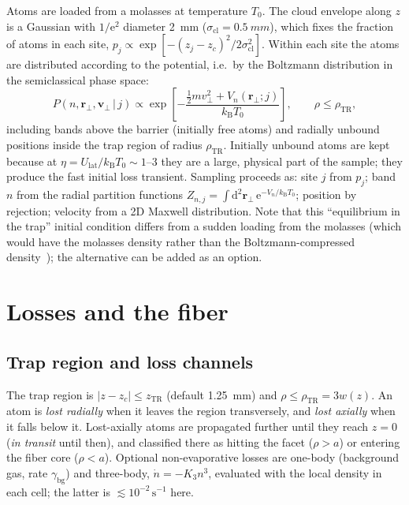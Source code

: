 \documentclass[11pt,a4paper]{article}
\newcommand{\ee}{\mathrm{e}}
\newcommand{\dd}{\mathrm{d}}
\newcommand{\kB}{k_\mathrm{B}}
\newcommand{\Ulat}{U_\mathrm{lat}}
\newcommand{\vperp}{\bm{v}_\perp}
\newcommand{\rperp}{\bm{r}_\perp}
\begin{document}
Atoms are loaded from a molasses at temperature $T_0$. The cloud envelope along $z$ is a Gaussian with $1/\ee^2$ diameter \SI{2}{mm} ($\sigma_\mathrm{cl}=\SI{0.5}{mm}$), which fixes the fraction of atoms in each site, $p_j\propto\exp[-(z_j-z_c)^2/2\sigma_\mathrm{cl}^2]$. Within each site the atoms are distributed according to the potential, i.e.\ by the Boltzmann distribution in the semiclassical phase space:
\begin{equation}
P(n,\rperp,\vperp\,|\,j)\propto\exp\!\left[-\frac{\frac12 m v_\perp^2+V_n(\rperp;j)}{\kB T_0}\right],\qquad \rho\le\rho_\mathrm{TR},
\end{equation}
including bands above the barrier (initially free atoms) and radially unbound positions inside the trap region of radius $\rho_\mathrm{TR}$. Initially unbound atoms are kept because at $\eta=\Ulat/\kB T_0\sim1$--3 they are a large, physical part of the sample; they produce the fast initial loss transient. Sampling proceeds as: site $j$ from $p_j$; band $n$ from the radial partition functions $Z_{n,j}=\int\dd^2\rperp\,\ee^{-V_n/\kB T_0}$; position by rejection; velocity from a 2D Maxwell distribution. Note that this ``equilibrium in the trap'' initial condition differs from a sudden loading from the molasses (which would have the molasses density rather than the Boltzmann-compressed density~\cite{Kuppens2000}); the alternative can be added as an option.

\section{Losses and the fiber}
\label{sec:losses}

\subsection{Trap region and loss channels}
The trap region is $|z-z_c|\le z_\mathrm{TR}$ (default \SI{1.25}{mm}) and $\rho\le\rho_\mathrm{TR}=3w(z)$. An atom is \emph{lost radially} when it leaves the region transversely, and \emph{lost axially} when it falls below it. Lost-axially atoms are propagated further until they reach $z=0$ (\emph{in transit} until then), and classified there as hitting the facet ($\rho>a$) or entering the fiber core ($\rho<a$). Optional non-evaporative losses are one-body (background gas, rate $\gamma_\mathrm{bg}$) and three-body, $\dot n=-K_3n^3$, evaluated with the local density in each cell; the latter is $\lesssim10^{-2}\,\mathrm{s^{-1}}$ here.
\end{document}
